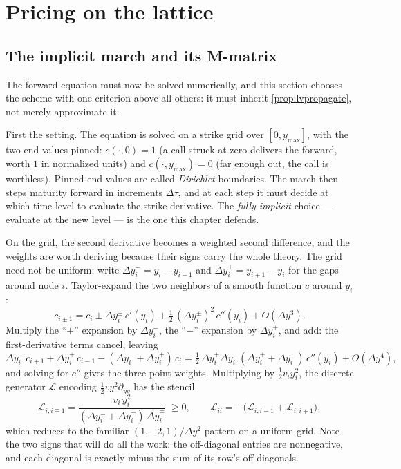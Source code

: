 \section{Pricing on the lattice}
\label{sec:lvlattice}

\subsection{The implicit march and its M-matrix}

The forward equation must now be solved numerically, and this section
chooses the scheme with one criterion above all others: it must
inherit \cref{prop:lvpropagate}, not merely approximate it.

First the setting.  The equation is solved on a strike grid over
$[0,y_{\max}]$, with the two end values pinned: $c(\cdot,0)=1$ (a call
struck at zero delivers the forward, worth $1$ in normalized units)
and $c(\cdot,y_{\max})=0$ (far enough out, the call is worthless).
Pinned end values are called \emph{Dirichlet} boundaries.  The march
then steps maturity forward in increments $\Delta\tau$, and at each
step it must decide at which time level to evaluate the strike
derivative.  The \emph{fully implicit} choice --- evaluate at the new
level --- is the one this chapter defends.

On the grid, the second derivative becomes a weighted second
difference, and the weights are worth deriving because their signs
carry the whole theory.  The grid need not be uniform; write
$\Delta y_i^-=y_i-y_{i-1}$ and $\Delta y_i^+=y_{i+1}-y_i$ for the gaps
around node $i$.  Taylor-expand the two neighbors of a smooth function
$c$ around $y_i$:
\[
c_{i\pm1}=c_i\pm\Delta y_i^{\pm}\,c'(y_i)
+\tfrac12\,(\Delta y_i^{\pm})^{2}\,c''(y_i)+O(\Delta y^{3}).
\]
Multiply the ``$+$'' expansion by $\Delta y_i^-$, the ``$-$''
expansion by $\Delta y_i^+$, and add: the first-derivative terms
cancel, leaving
\[
\Delta y_i^-\,c_{i+1}+\Delta y_i^+\,c_{i-1}
-(\Delta y_i^-+\Delta y_i^+)\,c_i
=\tfrac12\,\Delta y_i^+\Delta y_i^-(\Delta y_i^++\Delta y_i^-)\,
c''(y_i)+O(\Delta y^{4}),
\]
and solving for $c''$ gives the three-point weights.  Multiplying by
$\tfrac12 v_i y_i^{2}$, the discrete generator $\mathcal L$ encoding
$\tfrac12 v y^{2}\partial_{yy}$ has the stencil
\begin{equation}
\mathcal L_{i,i\mp1}
=\frac{v_i\,y_i^{2}}{(\Delta y_i^-+\Delta y_i^+)\,\Delta y_i^{\mp}}\;\ge0,
\qquad
\mathcal L_{ii}=-\big(\mathcal L_{i,i-1}+\mathcal L_{i,i+1}\big),
\label{eq:lvstencil}
\end{equation}
which reduces to the familiar $(1,-2,1)/\Delta y^{2}$ pattern on a
uniform grid.  Note the two signs that will do all the work: the
off-diagonal entries are nonnegative, and each diagonal is exactly
minus the sum of its row's off-diagonals.

